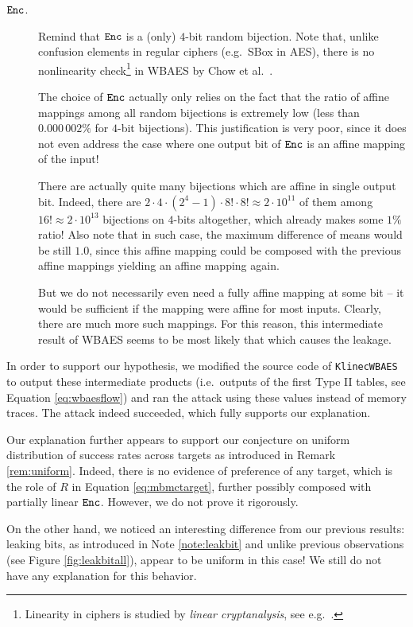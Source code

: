 \begin{description}
	\item[$\texttt{Enc}$.] Remind that $\texttt{Enc}$ is a (only) $4$-bit random bijection. Note that, unlike confusion elements in regular ciphers (e.g.\ SBox in AES), there is no nonlinearity check\footnote{Linearity in ciphers is studied by {\em linear cryptanalysis}, see e.g.\ \cite{matsui1993linear}.} in WBAES by Chow et al.\ \cite{chow2002aes}.
	
	The choice of $\texttt{Enc}$ actually only relies on the fact that the ratio of affine mappings among all random bijections is extremely low (less than $0.000\,002\%$ for $4$-bit bijections). This justification is very poor, since it does not even address the case where one output bit of $\texttt{Enc}$ is an affine mapping of the input!
	
	There are actually quite many bijections which are affine in single output bit. Indeed, there are $2\cdot4\cdot(2^4-1)\cdot8!\cdot8! \approx 2\cdot10^{11}$ of them among $16! \approx 2\cdot10^{13}$ bijections on $4$-bits altogether, which already makes some $1\%$ ratio! Also note that in such case, the maximum difference of means would be still $1.0$, since this affine mapping could be composed with the previous affine mappings yielding an affine mapping again.
	
	But we do not necessarily even need a fully affine mapping at some bit -- it would be sufficient if the mapping were affine for most inputs. Clearly, there are much more such mappings. For this reason, this intermediate result of WBAES seems to be most likely that which causes the leakage.
\end{description}

In order to support our hypothesis, we modified the source code of {\tt KlinecWBAES} to output these intermediate products (i.e.\ outputs of the first Type II tables, see Equation \ref{eq:wbaesflow}) and ran the attack using these values instead of memory traces. The attack indeed succeeded, which fully supports our explanation.

\begin{note}
\label{note:leakbituniform}
	Our explanation further appears to support our conjecture on uniform distribution of success rates across targets as introduced in Remark \ref{rem:uniform}. Indeed, there is no evidence of preference of any target, which is the role of $R$ in Equation \ref{eq:mbmctarget}, further possibly composed with partially linear $\texttt{Enc}$. However, we do not prove it rigorously.
	
	On the other hand, we noticed an interesting difference from our previous results: leaking bits, as introduced in Note \ref{note:leakbit} and unlike previous observations (see Figure \ref{fig:leakbitall}), appear to be uniform in this case! We still do not have any explanation for this behavior.
\end{note}

